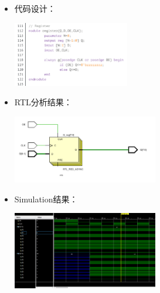 \documentclass[a4,10pt,zihao=-4]{ctexart}
\begin{document}
\begin{itemize}
\item
  代码设计：
  
  \includegraphics[width=0.4\textwidth]{REGISTER_Code.png}
\item
  RTL分析结果：
  
  \includegraphics[width=0.5\textwidth]{REGISTER_RTL.png}
\item
  Simulation结果：
  
  \includegraphics[width=0.5\textwidth]{REGISTER_Simulation.png}
\end{itemize}
\end{document}
